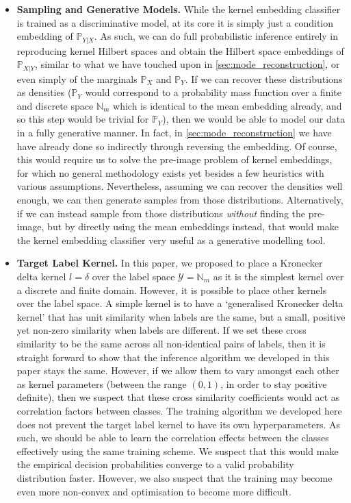 \documentclass{article}
\begin{document}
\begin{itemize}
		\item \textbf{Sampling and Generative Models.} While the kernel embedding classifier is trained as a discriminative model, at its core it is simply just a condition embedding of $\mathbb{P}_{Y | X}$. As such, we can do full probabilistic inference entirely in reproducing kernel Hilbert spaces and obtain the Hilbert space embeddings of $\mathbb{P}_{X | Y}$, similar to what we have touched upon in \cref{sec:mode_reconstruction}, or even simply of the marginals $\mathbb{P}_{X}$ and $\mathbb{P}_{Y}$. If we can recover these distributions as densities ($\mathbb{P}_{Y}$ would correspond to a probability mass function over a finite and discrete space $\mathbb{N}_{m}$ which is identical to the mean embedding already, and so this step would be trivial for $\mathbb{P}_{Y}$), then we would be able to model our data in a fully generative manner. In fact, in \cref{sec:mode_reconstruction} we have have already done so indirectly through reversing the embedding. Of course, this would require us to solve the pre-image problem of kernel embeddings, for which no general methodology exists yet besides a few heuristics with various assumptions. Nevertheless, assuming we can recover the densities well enough, we can then generate samples from those distributions. Alternatively, if we can instead sample from those distributions \textit{without} finding the pre-image, but by directly using the mean embeddings instead, that would make the kernel embedding classifier very useful as a generative modelling tool.
		
		\item \textbf{Target Label Kernel.} In this paper, we proposed to place a Kronecker delta kernel $l = \delta$ over the label space $\mathcal{Y} = \mathbb{N}_{m}$ as it is the simplest kernel over a discrete and finite domain. However, it is possible to place other kernels over the label space. A simple kernel is to have a `generalised Kronecker delta kernel' that has unit similarity when labels are the same, but a small, positive yet non-zero similarity when labels are different. If we set these cross similarity to be the same across all non-identical pairs of labels, then it is straight forward to show that the inference algorithm we developed in this paper stays the same. However, if we allow them to vary amongst each other as kernel parameters (between the range $(0, 1)$, in order to stay positive definite), then we suspect that these cross similarity coefficients would act as correlation factors between classes. The training algorithm we developed here does not prevent the target label kernel to have its own hyperparameters. As such, we should be able to learn the correlation effects between the classes effectively using the same training scheme. We suspect that this would make the empirical decision probabilities converge to a valid probability distribution faster. However, we also suspect that the training may become even more non-convex and optimisation to become more difficult.
		

\end{itemize}
\end{document}
